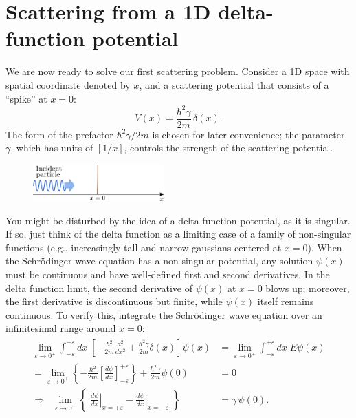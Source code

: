 \documentclass[pra,12pt]{revtex4}
\begin{document}
\section{Scattering from a 1D delta-function potential}
\label{sec:1dscatter}

We are now ready to solve our first scattering problem.  Consider a 1D
space with spatial coordinate denoted by $x$, and a scattering
potential that consists of a ``spike'' at $x = 0$:
\begin{equation}
  V(x) = \frac{\hbar^2\gamma}{2m} \,\delta(x).
\end{equation}
The form of the prefactor $\hbar^2\gamma/2m$ is chosen for later
convenience; the parameter $\gamma$, which has units of $[1/x]$,
controls the strength of the scattering potential.

\begin{figure}[h]
  \centering\includegraphics[width=0.45\textwidth]{scattering1d}
\end{figure}

You might be disturbed by the idea of a delta function potential, as
it is singular.  If so, just think of the delta function as a limiting
case of a family of non-singular functions (e.g., increasingly tall
and narrow gaussians centered at $x=0$).  When the Schr\"odinger wave
equation has a non-singular potential, any solution $\psi(x)$ must be
continuous and have well-defined first and second derivatives.  In the
delta function limit, the second derivative of $\psi(x)$ at $x=0$
blows up; moreover, the first derivative is discontinuous but finite,
while $\psi(x)$ itself remains continuous.  To verify this, integrate
the Schr\"odinger wave equation over an infinitesimal range around $x
= 0$:
\begin{align}
  \begin{aligned}\lim_{\varepsilon\rightarrow 0^+} \int_{-\varepsilon}^{+\varepsilon} dx\; \left[-\frac{\hbar^2}{2m} \frac{d^2}{dx^2} + \frac{\hbar^2\gamma}{2m} \delta(x)\right] \psi(x) &= \lim_{\varepsilon\rightarrow 0^+} \int_{-\varepsilon}^{+\varepsilon} dx\; E \psi(x) \\ = \lim_{\varepsilon\rightarrow 0^+} \left\{-\frac{\hbar^2}{2m} \left[\frac{d\psi}{dx}\right]_{-\varepsilon}^{+\varepsilon} \right\} + \frac{\hbar^2\gamma}{2m} \psi(0) &= 0\\ \Rightarrow \;\; \lim_{\varepsilon\rightarrow 0^+} \left\{\; \left.\frac{d\psi}{dx}\right|_{x = +\varepsilon} - \left.\frac{d\psi}{dx}\right|_{x = -\varepsilon}\; \right\}  &=  \gamma \,\psi(0).\end{aligned}
\end{align}
\end{document}
